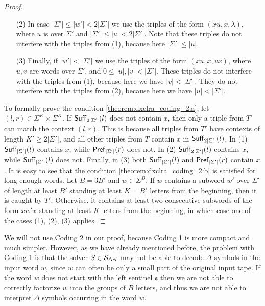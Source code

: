 \begin{proof}
\begin{enumerate}
\item[(2)] In case $|\Sigma'| \le |w'| < 2 |\Sigma'|$ we use the triples of the form $(xu, x, \lambda)$, where $u$ is over $\Sigma'$ and $|\Sigma'| \le |u| < 2 |\Sigma'|$. Note that these triples do not interfere with the triples from (1), because here $|\Sigma'| \le |u|$.
\item[(3)] Finally, if $|w'| < |\Sigma'|$ we use the triples of the form $(xu, x, vx)$, where $u, v$ are words over $\Sigma'$, and $0 \le |u|, |v| < |\Sigma'|$. These triples do not interfere with the triples from (1), because here we have $|v| < |\Sigma'|$. They do not interfere with the triples from (2), because here we have $|u| < |\Sigma'|$.
\end{enumerate}
To formally prove the condition \ref{theorem:dxclra_coding_2:a}, let $(l, r) \in \Sigma^K \times \Sigma^K$. If $\textup{\sf Suff\/}_{2|\Sigma'|}(l)$ does not contain $x$, then only a triple from $T'$ can match the context $(l, r)$. This is because all triples from $T'$ have contexts of length $K' \ge 2|\Sigma'|$, and all other triples from $T$ contain $x$ in $\textup{\sf Suff\/}_{2|\Sigma'|}(l)$. In (1) $\textup{\sf Suff\/}_{|\Sigma'|}(l)$ contains $x$, while $\textup{\sf Pref\/}_{|\Sigma'|}(r)$ does not. In (2) $\textup{\sf Suff\/}_{2|\Sigma'|}(l)$ contains $x$, while $\textup{\sf Suff\/}_{|\Sigma'|}(l)$ does not. Finally, in (3) both $\textup{\sf Suff\/}_{|\Sigma'|}(l)$ and $\textup{\sf Pref\/}_{|\Sigma'|}(r)$ contain $x$. It is easy to see that the condition \ref{theorem:dxclra_coding_2:b} is satisfied for long enough words. Let $B = 3B'$ and $w \in \Sigma^B$. If $w$ contains a subword $w'$ over $\Sigma'$ of length at least $B'$ standing at least $K = B'$ letters from the beginning, then it is caught by $T'$. Otherwise, it contains at least two consecutive subwords of the form $xw'x$ standing at least $K$ letters from the beginning, in which case one of the cases (1), (2), (3) applies.
\end{proof}

We will not use Coding 2 in our proof, because Coding 1 is more compact and much simpler. However, as we have already mentioned before, the problem with Coding 1 is that the solver $S \in \mathcal{S}_{\Delta cl}$ may not be able to decode $\Delta$ symbols in the input word $w$, since $w$ can often be only a small part of the original input tape. If the word $w$ does not start with the left sentinel $\cent$ then we are not able to correctly factorize $w$ into the groups of $B$ letters, and thus we are not able to interpret $\Delta$ symbols occurring in the word $w$.

